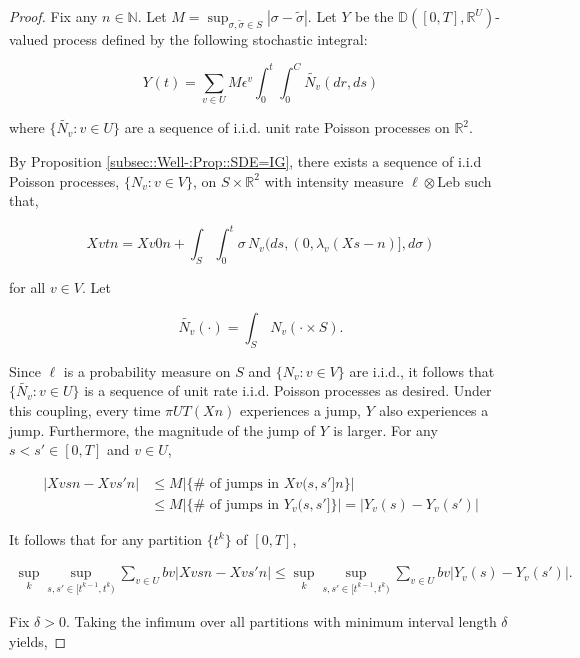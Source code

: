 \documentclass[12pt]{article}
\newcommand{\mb}{\mathbb}
\newcommand{\te}{\text}
\newcommand{\ep}{\epsilon}
\newcommand{\ind}{\hspace{24pt}}
\newcommand{\cad}{\mb{D}}							%
\renewcommand{\v}{v}							%
\renewcommand{\U}{U}							%
\renewcommand{\S}{S}							%
\newcommand{\s}{\sigma}							%
\renewcommand{\b}{b}							%
\newcommand{\ev}[1]{\ep^{#1}}					%
\newcommand{\T}{T}								%
\renewcommand{\t}{t}							%
\newcommand{\proj}{\pi}							%
\renewcommand{\tt}{s}							%
\newcommand{\ttt}{s'}							%
\newcommand{\X}{X}								%
\renewcommand{\ss}[1]{^{#1}}					%
\newcommand{\poiss}[1]{N_{#1}}						%
\newcommand{\leb}{\te{Leb}}							%
\newcommand{\pup}[1]{^{#1}}							%
\renewcommand{\ss}{\tilde{\s}}					%
\newcommand{\V}{V}									%
\renewcommand{\r}{r}								%
\renewcommand{\it}{k}								%
\newcommand{\numb}{n}								%
\newcommand{\rxvtt}[2]{Y_{#1}{(#2)}}				%
\newcommand{\rxvtts}[2]{Y_{#1}{#2}}					%
\newcommand{\rate}[1]{\lambda_{#1}}					%
\newcommand{\const}[1]{C_{#1}}						%
\newcommand{\Sm}{\ell}								%
\newcommand{\alt}{\widetilde}						%
\begin{document}
\begin{proof}
Fix any \(\numb \in \mb{N}\). Let \(M = \sup_{\s,\ss \in \S} |\s - \ss|\). Let \(\rxvtts{}{}\) be the \(\cad([0,\T],\mb{R}^\U)\)-valued process defined by the following stochastic integral:

\[\rxvtt{}{\t} = \sum_{\v \in \U}M\ev{\v}\int_0^\t\int_0^{\const{}}\alt{\poiss{\v}}(d\r, d\tt)\]

where \(\{\alt{\poiss{\v}}:\v \in \U\}\) are a sequence of i.i.d. unit rate Poisson processes on \(\mb{R}^2\). 

\ind By Proposition \ref{subsec::Well-:Prop::SDE=IG}, there exists a sequence of i.i.d Poisson processes, \(\{\poiss{\v}:\v\in \V\}\), on \(\S\times\mb{R}^2\) with intensity measure \(\Sm\otimes \leb\) such that,

\[\X{\v}{\t}{\numb} = \X{\v}{0}{\numb} + \int_\S\int_0^\t \s\,\poiss{\v}(d\tt,(0,\rate{\v}(\X{}{\tt-}{\numb})],d\s)\]

for all \(\v\in \V\). Let

\[\alt{\poiss{\v}}(\cdot) = \int_\S\,\poiss{\v}(\cdot\times \S).\]

Since \(\Sm\) is a probability measure on \(\S\) and \(\{\poiss{\v}:\v\in \V\}\) are i.i.d., it follows that \(\{\alt{\poiss{\v}}:\v\in \U\}\) is a sequence of unit rate i.i.d. Poisson processes as desired. Under this coupling, every time \(\proj{\U}{\T}(\X{}{}{\numb})\) experiences a jump, \(\rxvtts{}{}\) also experiences a jump. Furthermore, the magnitude of the jump of \(\rxvtts{}{}\) is larger. For any \(\tt<\ttt\in [0,\T]\) and \(\v\in \U\),

\begin{align*}
|\X{\v}{\tt}{\numb} - \X{\v}{\ttt}{\numb}|&\leq M\left|\{\#\te{ of jumps in }\X{\v}{(\tt,\ttt]}{\numb}\}\right| \\
&\leq M\left|\{\#\te{ of jumps in }\rxvtts{\v}{(\tt,\ttt]}\}\right| = \left|\rxvtt{\v}{\tt} - \rxvtt{\v}{\ttt}\right|
\end{align*}

It follows that for any partition \(\{\t\pup{\it}\}\) of \([0,\T]\),

\begin{align*}
\sup_\it\sup_{\tt,\ttt \in [\t\pup{\it-1},\t\pup{\it})} \sum_{\v\in \U} \b{\v}|\X{\v}{\tt}{\numb} - \X{\v}{\ttt}{\numb}|\leq \sup_\it\sup_{\tt,\ttt \in [\t\pup{\it-1},\t\pup{\it})} \sum_{\v\in \U} \b{\v}|\rxvtt{\v}{\tt} - \rxvtt{\v}{\ttt}|.
\end{align*}

Fix \(\delta > 0\). Taking the infimum over all partitions with minimum interval length \(\delta\) yields,


\end{proof}
\end{document}
